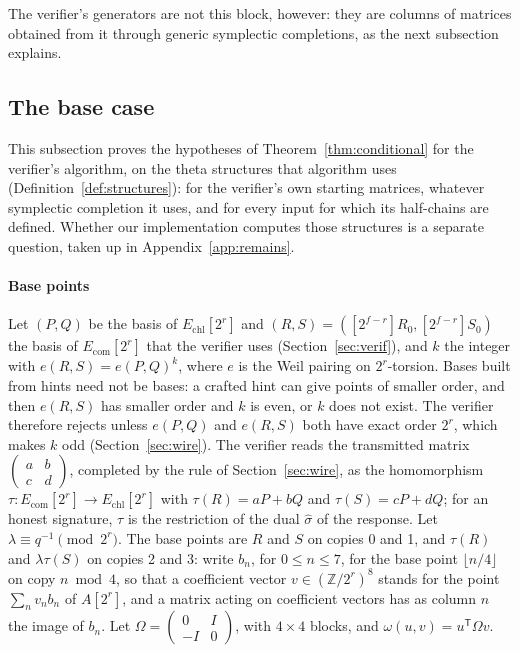 \documentclass[version=preprint]{iacrcc}
\newcommand{\Ecom}{E_{\mathrm{com}}}
\newcommand{\Echl}{E_{\mathrm{chl}}}
\begin{document}
    The verifier's generators are not this block, however: they are columns
    of matrices obtained from it through generic symplectic completions, as
    the next subsection explains.

    \subsection{The base case}
    \label{app:conjecture}

    This subsection proves the hypotheses of Theorem~\ref{thm:conditional} for
    the verifier's algorithm, on the theta structures that algorithm uses
    (Definition~\ref{def:structures}): for the verifier's own starting
    matrices, whatever symplectic completion it uses, and for every input for
    which its half-chains are defined. Whether our implementation computes
    those structures is a separate question, taken up in
    Appendix~\ref{app:remains}.

    \paragraph{Base points}
    Let $(P, Q)$ be the basis of $\Echl[2^r]$ and $(R, S) = ([2^{f-r}]R_0,
    [2^{f-r}]S_0)$ the basis of $\Ecom[2^r]$ that the verifier uses
    (Section~\ref{sec:verif}), and $k$ the integer with $e(R, S) =
    e(P, Q)^k$, where $e$ is the Weil pairing on $2^r$-torsion. Bases built
    from hints need not be bases: a crafted hint can give points of smaller
    order, and then $e(R, S)$ has smaller order and $k$ is even, or $k$ does not
    exist. The verifier therefore rejects unless $e(P, Q)$ and $e(R, S)$ both
    have exact order $2^r$, which makes $k$ odd (Section~\ref{sec:wire}). The
    verifier reads the transmitted matrix $\left(\begin{smallmatrix} a & b \\ c &
        d \end{smallmatrix}\right)$, completed by the rule of
    Section~\ref{sec:wire}, as the homomorphism $\tau \colon \Ecom[2^r] \to
    \Echl[2^r]$ with $\tau(R) = aP + bQ$ and $\tau(S) = cP + dQ$; for an honest
    signature, $\tau$ is the restriction of the dual $\widehat\sigma$ of the
    response. Let $\lambda \equiv q^{-1} \pmod{2^r}$. The base points are $R$
    and $S$ on copies 0 and 1, and $\tau(R)$ and $\lambda\tau(S)$ on copies 2
    and 3: write $b_n$, for $0 \le n \le 7$, for the base point $\lfloor n/4
    \rfloor$ on copy $n \bmod 4$, so that a coefficient vector $v \in (\mathbb
    Z/2^r)^8$ stands for the point $\sum_n v_n b_n$ of $A[2^r]$, and a matrix
    acting on coefficient vectors has as column $n$ the image of $b_n$. Let
    $\Omega = \left(\begin{smallmatrix} 0 & I \\ -I & 0
    \end{smallmatrix}\right)$, with $4 \times 4$ blocks, and $\omega(u, v) =
    u^{\mathsf T} \Omega v$.
\end{document}
